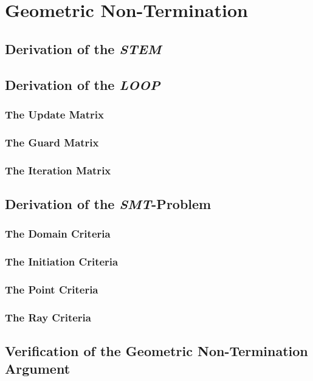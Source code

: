 \chapter{Geometric Non-Termination}

\section{Derivation of the \emph{STEM}}

\section{Derivation of the \emph{LOOP}}

\subsection{The Update Matrix}

\subsection{The Guard Matrix}

\subsection{The Iteration Matrix}

\section{Derivation of the \emph{SMT}-Problem}

\subsection{The Domain Criteria}

\subsection{The Initiation Criteria}

\subsection{The Point Criteria}

\subsection{The Ray Criteria}

\section{Verification of the Geometric Non-Termination Argument}
	 
